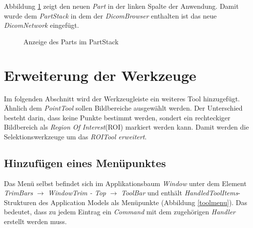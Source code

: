 Abbildung \ref{partfinal} zeigt den neuen \textit{Part} in der linken Spalte der Anwendung. Damit wurde dem \textit{PartStack} in dem der \textit{DicomBrowser} enthalten ist das neue \textit{DicomNetwork} eingefügt.

\begin{figure}[H]
  \vspace{0.5cm}
  \centering
   \caption{Anzeige des Parts im PartStack}
  \label{partfinal}
  \vspace{0.5cm}
\end{figure}

\section{Erweiterung der Werkzeuge}
Im folgenden Abschnitt wird der Werkzeugleiste ein weiteres Tool hinzugefügt. Ähnlich dem \textit{PointTool} sollen Bildbereiche ausgewählt werden. Der Unterschied besteht darin, dass keine Punkte bestimmt werden, sondert ein rechteckiger Bildbereich als \textit{Region Of Interest}(ROI) markiert werden kann. Damit werden die Selektionswerkzeuge um das \textit{ROITool erweitert}.\\

\subsection{Hinzufügen eines Menüpunktes}

Das Menü selbst befindet sich im Applikationsbaum \textit{Window} unter dem Element \textit{TrimBars} $\rightarrow$ \textit{WindowTrim - Top} $\rightarrow$ \textit{ToolBar} und enthält \textit{HandledToolItems}-Strukturen des Application Models als Menüpunkte (Abbildung \ref{toolmenu}). Das bedeutet, dass zu jedem Eintrag ein \textit{Command} mit dem zugehörigen \textit{Handler} erstellt werden muss.

